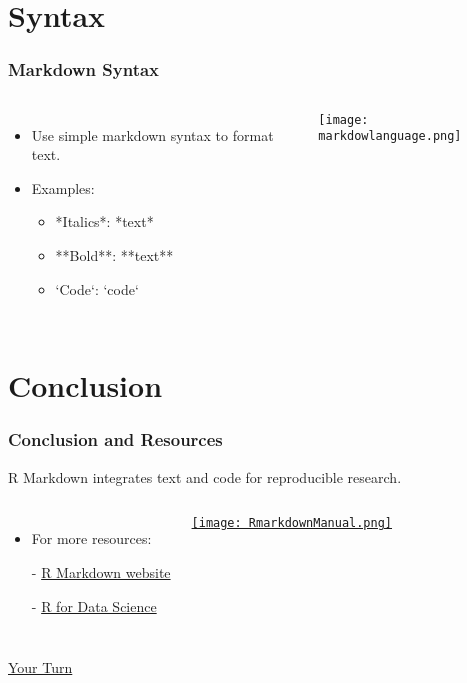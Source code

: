 \documentclass[xcolor=x11names,compress]{beamer}
\renewcommand{\(}{\begin{columns}}
\renewcommand{\)}{\end{columns}}
\newcommand{\<}[1]{\begin{column}{#1}}
\renewcommand{\>}{\end{column}}
\begin{document}
\section{Syntax}
\begin{frame}
    \frametitle{Markdown Syntax}
    \begin{columns}
            \begin{itemize}[<+->]
                \item Use simple markdown syntax to format text.
                \item Examples:
                \begin{itemize}
                    \item *Italics*: *text*
                    \item **Bold**: **text**
                    \item `Code`: `code`
                \end{itemize}
            \end{itemize}
            \texttt{[image: markdowlanguage.png]}
    \end{columns}
\end{frame}

\section{Conclusion}
\begin{frame}
    \frametitle{Conclusion and Resources}
    R Markdown integrates text and code for reproducible research.
    \begin{columns}
            \begin{itemize}[<+->]
                \item For more resources:
                \item[-]\href{https://rmarkdown.rstudio.com}{R Markdown website}
                \item[-] \href{https://r4ds.had.co.nz/}{R for Data Science}
            \end{itemize}
            \href{https://rmarkdown.rstudio.com/lesson-2.html}{\texttt{[image: RmarkdownManual.png]}}
    \end{columns}
\end{frame}

{

\begin{frame}
\hspace{4cm}
\begin{center}
\Huge{\href{https://github.com/XtopheB/BigData/blob/main/ReportExercise.Rmd}{Your Turn}}
\end{center}
\end{frame}

} %
\end{document}

